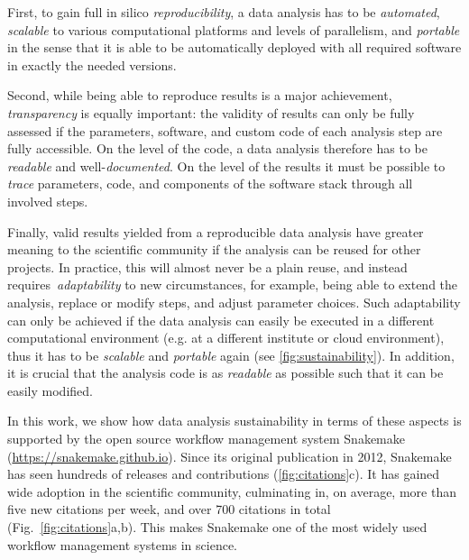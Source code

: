 \documentclass[10pt,a4paper,twocolumn]{article}
\let\plainurl\url
\renewcommand{\url}[1]{\protect\plainurl{#1}}
\begin{document}
First, to gain full in silico \emph{reproducibility}, a data analysis has to be \emph{automated}, \emph{scalable} to various computational platforms and levels of parallelism, and \emph{portable} in the sense that it is able to be automatically deployed with all required software in exactly the needed versions.

Second, while being able to reproduce results is a major achievement, \emph{transparency} is equally important: the validity of results can only be fully assessed if the parameters, software, and custom code of each analysis step are fully accessible.
On the level of the code, a data analysis therefore has to be \emph{readable} and well-\emph{documented}.
On the level of the results it must be possible to \emph{trace} parameters, code, and components of the software stack through all involved steps.

Finally, valid results yielded from a reproducible data analysis have greater meaning to the scientific community if the analysis can be reused for other projects.
In practice, this will almost never be a plain reuse, and instead requires~\emph{adaptability} to new circumstances, for example, being able to extend the analysis, replace or modify steps, and adjust parameter choices.
Such adaptability can only be achieved if the data analysis can easily be executed in a different computational environment (e.g. at a different institute or cloud environment), thus it has to be \emph{scalable} and \emph{portable} again (see \autoref{fig:sustainability}).
In addition, it is crucial that the analysis code is as \emph{readable} as possible such that it can be easily modified.

In this work, we show how data analysis sustainability in terms of these aspects is supported by the open source workflow management system Snakemake (\url{https://snakemake.github.io}).
Since its original publication in 2012, Snakemake has seen hundreds of releases and contributions (\autoref{fig:citations}c).
It has gained wide adoption in the scientific community, culminating in, on average, more than five new citations per week, and over 700 citations in total (Fig.~\ref{fig:citations}a,b).
This makes Snakemake one of the most widely used workflow management systems in science.
\end{document}
